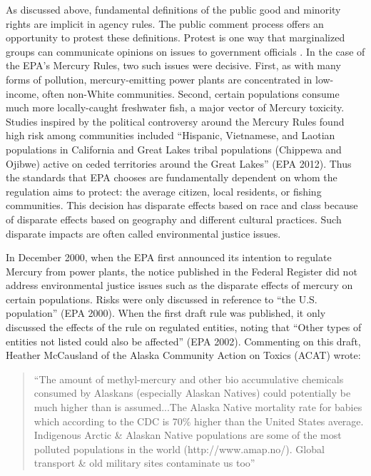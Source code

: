 As discussed above, fundamental definitions of the public good and minority rights are implicit in agency rules. The public comment process offers an opportunity to protest these definitions. Protest is one way that  marginalized groups can communicate opinions on issues to government officials \citep{Gillion2015ProtestDistrict,Gillion2013ThePolicy}. In the case of the EPA's Mercury Rules, two such issues were decisive. First, as with many forms of pollution, mercury-emitting power plants are concentrated in low-income, often non-White communities. Second, certain populations consume much more locally-caught freshwater fish, a major vector of Mercury toxicity. Studies inspired by the political controversy around the Mercury Rules found high risk among communities included ``Hispanic, Vietnamese, and Laotian populations in California and Great Lakes tribal populations (Chippewa and Ojibwe) active on ceded territories around the Great Lakes'' (EPA 2012). Thus the standards that EPA chooses are fundamentally dependent on whom the regulation aims to protect: the average citizen, local residents, or fishing communities. This decision has disparate effects based on race and class because of disparate effects based on geography and different cultural practices. Such disparate impacts are often called environmental justice issues.

In December 2000, when the EPA first announced its intention to regulate Mercury from power plants, the notice published in the Federal Register did not address environmental justice issues such as the disparate effects of mercury on certain populations. Risks were only discussed in reference to ``the U.S. population'' (EPA 2000). When the first draft rule was published, it only discussed the effects of the rule on regulated entities, noting that ``Other types of entities not listed could also be affected'' (EPA 2002). Commenting on this draft, Heather McCausland of the Alaska Community Action on Toxics (ACAT) wrote:
\begin{quotation}
``The amount of methyl-mercury and other bio accumulative chemicals consumed by Alaskans (especially Alaskan Natives) could potentially be much higher than is assumed...The Alaska Native mortality rate for babies which according to the CDC is 70\% higher than the United States average. Indigenous Arctic \& Alaskan Native populations are some of the most polluted populations in the world (http://www.amap.no/). Global transport \& old military sites contaminate us too''
\end{quotation}


